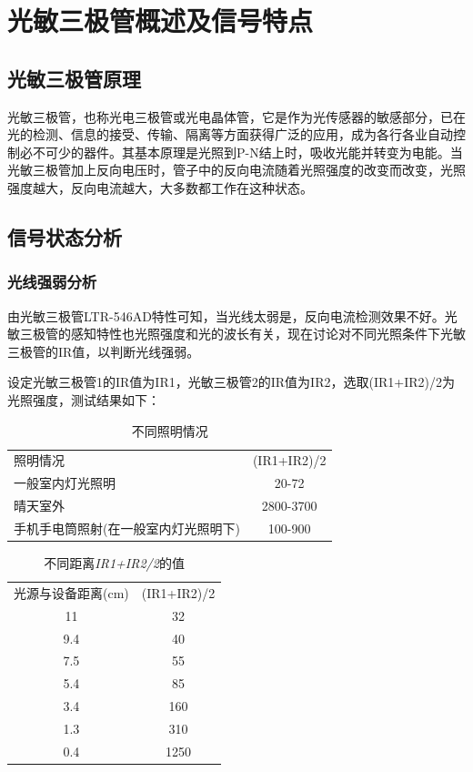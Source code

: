 \section{光敏三极管概述及信号特点}

\subsection{光敏三极管原理}
\par{光敏三极管，也称光电三极管或光电晶体管，它是作为光传感器的敏感部分，已在光的检测、信息的接受、传输、隔离等方面获得广泛的应用，成为各行各业自动控制必不可少的器件。其基本原理是光照到P-N结上时，吸收光能并转变为电能。当光敏三极管加上反向电压时，管子中的反向电流随着光照强度的改变而改变，光照强度越大，反向电流越大，大多数都工作在这种状态。}

\subsection{信号状态分析}

\subsubsection{光线强弱分析}
\par{由光敏三极管LTR-546AD特性可知，当光线太弱是，反向电流检测效果不好。光敏三极管的感知特性也光照强度和光的波长有关，现在讨论对不同光照条件下光敏三极管的IR值，以判断光线强弱。}
\par{设定光敏三极管1的IR值为IR1，光敏三极管2的IR值为IR2，选取(IR1+IR2)/2为光照强度，测试结果如下：}

\begin{table}[h]
	\centering
	\begin{tabular}{|l|c|}
        照明情况&(IR1+IR2)/2\\
        一般室内灯光照明&20-72\\
        晴天室外&2800-3700\\
        手机手电筒照射(在一般室内灯光照明下)&100-900\\
	\end{tabular}
	\caption{不同照明情况}
	\label{tab:1.1}
\end{table}


\begin{table}[h]
	\centering
	\begin{tabular}{|c|c|}
        光源与设备距离(cm)&(IR1+IR2)/2\\
        11&32\\
        9.4&40\\
        7.5&55\\
        5.4&85\\
        3.4&160\\
        1.3&310\\
        0.4&1250\\
	\end{tabular}
	\caption{不同距离\emph{IR1+IR2/2}的值}
	\label{tab:1.2}
\end{table}

